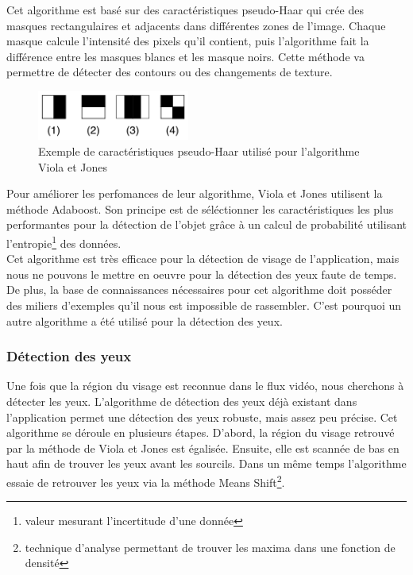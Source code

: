 Cet algorithme est basé sur des caractéristiques pseudo-Haar qui crée des masques rectangulaires et adjacents
dans différentes zones de l'image. Chaque masque calcule l'intensité des pixels qu'il contient, puis l'algorithme fait
la différence entre les masques blancs et les masque noirs. Cette méthode va permettre de détecter des contours ou des changements de 
texture.\\

\begin{figure}[H]
\center
\includegraphics[width=5cm]{image/pseudo_haar.png}
\caption{Exemple de caractéristiques pseudo-Haar utilisé pour l'algorithme Viola et Jones}
\end{figure}

Pour améliorer les perfomances de leur algorithme, Viola et Jones utilisent la méthode Adaboost. Son
principe est de séléctionner les caractéristiques les plus performantes pour la détection de l'objet grâce à
un calcul de probabilité utilisant l'entropie\footnote{valeur mesurant l'incertitude d'une donnée} des données.\\

Cet algorithme est très efficace pour la détection de visage de l'application, mais nous ne pouvons le mettre
en oeuvre pour la détection des yeux faute de temps. De plus, la base de connaissances nécessaires pour cet 
algorithme doit posséder des miliers d'exemples qu'il nous est impossible de rassembler. C'est pourquoi
un autre algorithme a été utilisé pour la détection des yeux.

\subsubsection{Détection des yeux}
Une fois que la région du visage est reconnue dans le flux vidéo, nous cherchons à détecter les yeux. 
L'algorithme de détection des yeux déjà existant dans l'application permet une détection des yeux 
robuste, mais assez peu précise. Cet algorithme se déroule en plusieurs étapes. D'abord, la région du visage 
retrouvé par la méthode de Viola et Jones est égalisée. Ensuite, elle est scannée de bas en haut afin de
trouver les yeux avant les sourcils. Dans un même temps l'algorithme essaie de retrouver les yeux via la
méthode Means Shift\footnote{technique d'analyse permettant de trouver les maxima dans une fonction de densité}.\\



